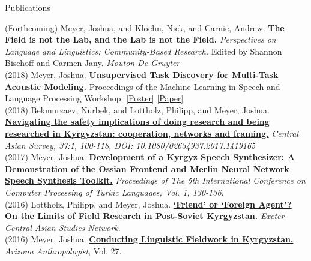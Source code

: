 \documentclass{resume} %
\begin{document}
\begin{minipage}{\textwidth}

  \begin{rSection}{Publications}
    \vspace{.25cm}

    {(Forthcoming)} {Meyer, Joshua, and Kloehn, Nick, and Carnie, Andrew.} {{\bf The Field is not the Lab, and the Lab is not the Field.}} {{\it Perspectives on Language and Linguistics: Community-Based Research.} Edited by Shannon Bischoff and Carmen Jany. \textit{Mouton De Gruyter}}\\

      {(2018)} {Meyer, Joshua.} {\bf Unsupervised Task Discovery for Multi-Task Acoustic Modeling.} {Proceedings of the Machine Learning in Speech and Language Processing Workshop.} {\href{https://github.com/JRMeyer/mlslp/blob/master/poster/mlslp-poster.pdf}{[Poster]}} {\href{https://sites.google.com/view/mlslp/proceedings}{[Paper]}} \\  
  

        {(2018)} {Bekmurzaev, Nurbek, and Lottholz, Philipp, and Meyer, Joshua.} {\href{https://www.tandfonline.com/doi/abs/10.1080/02634937.2017.1419165}{\textbf{Navigating the safety implications of doing research and being researched in Kyrgyzstan: cooperation, networks and framing.}}} {\textit{Central Asian Survey, 37:1, 100-118, DOI: 10.1080/02634937.2017.1419165}}\\
        
        {(2017)} {Meyer, Joshua.} {\href{http://www.turklang.tatar/wp-content/uploads/2017/05/TurkLang-2017.-Tom1.pdf}{{\bf Development of a Kyrgyz Speech Synthesizer: A Demonstration of the Ossian Frontend and Merlin Neural Network Speech Synthesis Toolkit.}}} {\textit{Proceedings of The 5th International Conference on Computer Processing of Turkic Languages, Vol. 1, 130-136}.}\\ 

        {(2016)} {Lottholz, Philipp, and Meyer, Joshua.} { \href{https://blogs.exeter.ac.uk/excas/2016/04/14/friend-or-foreign-agent-on-the-limits-of-field-research-in-post-soviet-kyrgyzstan/}{\bf ‘Friend’ or ‘Foreign Agent’? On the Limits of Field Research in Post-Soviet Kyrgyzstan.}} {\textit{Exeter Central Asian Studies Network}.}\\
 
        {(2016)} {Meyer, Joshua.} { \href{https://journals.uair.arizona.edu/index.php/arizanthro/article/viewFile/21375/20949}{\bf Conducting Linguistic Fieldwork in Kyrgyzstan.}} {\textit{Arizona Anthropologist}, Vol. 27.}   \\  

\end{rSection}

\end{minipage}
\end{document}
